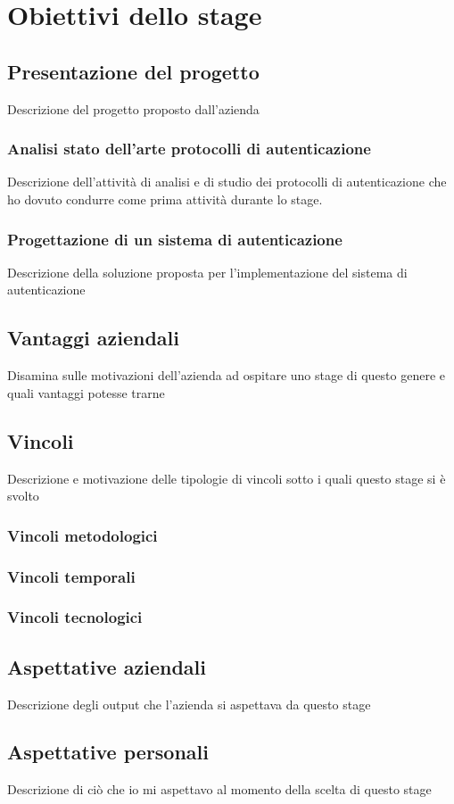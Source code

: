 
\chapter{Obiettivi dello stage}
\label{cap:obiettivi}

\section{Presentazione del progetto}
Descrizione del progetto proposto dall'azienda

\subsection{Analisi stato dell'arte protocolli di autenticazione}
Descrizione dell'attività di analisi e di studio dei protocolli di autenticazione che ho dovuto condurre come prima attività durante lo stage.

\subsection{Progettazione di un sistema di autenticazione}
Descrizione della soluzione proposta per l'implementazione del sistema di autenticazione

\section{Vantaggi aziendali}
Disamina sulle motivazioni dell'azienda ad ospitare uno stage di questo genere e quali vantaggi potesse trarne

\section{Vincoli}
Descrizione e motivazione delle tipologie di vincoli sotto i quali questo stage si è svolto

\subsection{Vincoli metodologici}

\subsection{Vincoli temporali}

\subsection{Vincoli tecnologici}

\section{Aspettative aziendali}
Descrizione degli output che l'azienda si aspettava da questo stage

\section{Aspettative personali}
Descrizione di ciò che io mi aspettavo al momento della scelta di questo stage

